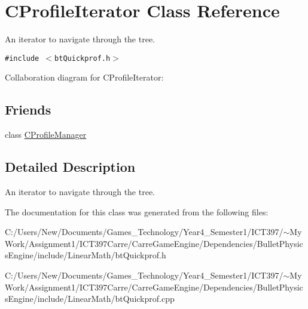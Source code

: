 \hypertarget{class_c_profile_iterator}{
\section{CProfileIterator Class Reference}
\label{class_c_profile_iterator}
}
An iterator to navigate through the tree.  


{\tt \#include $<$btQuickprof.h$>$}

Collaboration diagram for CProfileIterator:\subsection*{Friends}
\begin{CompactItemize}
\item 
\hypertarget{class_c_profile_iterator_7c8684494a3a73a8d3f19e229442b19a}{
class \hyperlink{class_c_profile_iterator_7c8684494a3a73a8d3f19e229442b19a}{CProfileManager}}
\label{class_c_profile_iterator_7c8684494a3a73a8d3f19e229442b19a}

\end{CompactItemize}


\subsection{Detailed Description}
An iterator to navigate through the tree. 

The documentation for this class was generated from the following files:\begin{CompactItemize}
\item 
C:/Users/New/Documents/Games\_\-Technology/Year4\_\-Semester1/ICT397/$\sim$My Work/Assignment1/ICT397Carre/CarreGameEngine/Dependencies/BulletPhysicsEngine/include/LinearMath/btQuickprof.h\item 
C:/Users/New/Documents/Games\_\-Technology/Year4\_\-Semester1/ICT397/$\sim$My Work/Assignment1/ICT397Carre/CarreGameEngine/Dependencies/BulletPhysicsEngine/include/LinearMath/btQuickprof.cpp\end{CompactItemize}
